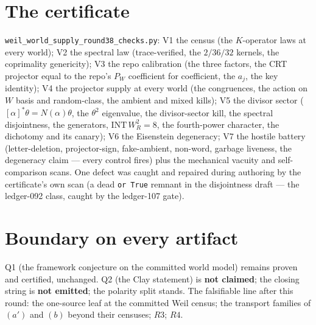 \documentclass[11pt]{article}
\begin{document}
\section*{The certificate}

\texttt{weil\_world\_supply\_round38\_checks.py}: V1 the census (the
$K$-operator laws at every world); V2 the spectral law (trace-verified, the
$2/36/32$ kernels, the coprimality genericity); V3 the repo calibration
(the three factors, the CRT projector equal to the repo's $P_W$ coefficient
for coefficient, the $a_j$, the key identity); V4 the projector supply at
every world (the congruences, the action on $W$ basis and random-class, the
ambient and mixed kills); V5 the divisor sector ($[\alpha]^*\theta =
N(\alpha)\theta$, the $\theta^2$ eigenvalue, the divisor-sector kill, the
spectral disjointness, the generators, $\mathrm{INT}\,W_R^2 = 8$, the
fourth-power character, the dichotomy and its canary); V6 the Eisenstein
degeneracy; V7 the hostile battery (letter-deletion, projector-sign,
fake-ambient, non-word, garbage liveness, the degeneracy claim --- every
control fires) plus the mechanical vacuity and self-comparison scans. One
defect was caught and repaired during authoring by the certificate's own
scan (a dead \texttt{or True} remnant in the disjointness draft --- the
ledger-092 class, caught by the ledger-107 gate).

\section*{Boundary on every artifact}

Q1 (the framework conjecture on the committed world model) remains proven
and certified, unchanged. Q2 (the Clay statement) is \textbf{not claimed};
the closing string is \textbf{not emitted}; the polarity split stands. The
falsifiable line after this round: the one-source leaf at the committed Weil
census; the transport families of $(a')$ and $(b)$ beyond their censuses;
$R3$; $R4$.
\end{document}
